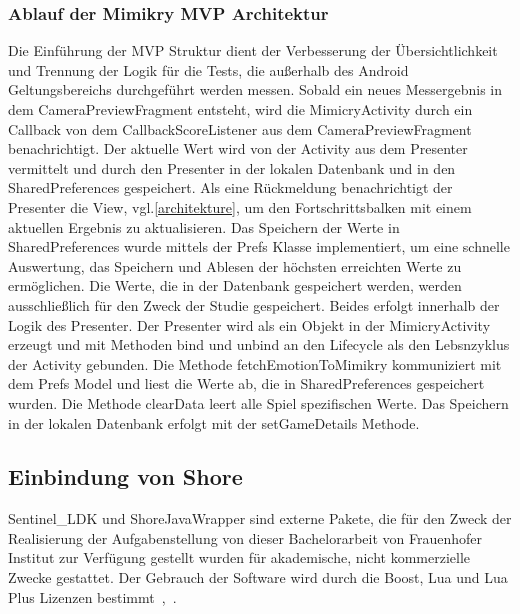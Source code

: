 \subsubsection{Ablauf der Mimikry MVP Architektur}
Die Einführung der MVP Struktur dient der Verbesserung der Übersichtlichkeit und Trennung der Logik für die Tests, die außerhalb des Android Geltungsbereichs durchgeführt werden messen. 
Sobald ein neues Messergebnis in dem CameraPreviewFragment entsteht, wird die MimicryActivity durch ein Callback von dem CallbackScoreListener aus dem CameraPreviewFragment benachrichtigt. Der aktuelle Wert wird von der Activity aus dem Presenter vermittelt und durch den Presenter in der lokalen Datenbank und in den SharedPreferences gespeichert. Als eine Rückmeldung benachrichtigt der Presenter die View, vgl.\ref{architekture}, um den Fortschrittsbalken mit einem aktuellen Ergebnis zu aktualisieren. 
Das Speichern der Werte in SharedPreferences wurde mittels der Prefs Klasse implementiert, um eine schnelle Auswertung, das Speichern und Ablesen der höchsten erreichten Werte zu ermöglichen. Die Werte, die in der Datenbank gespeichert werden, werden ausschließlich für den Zweck der Studie gespeichert. Beides erfolgt innerhalb der Logik des Presenter.
Der Presenter wird als ein Objekt in der MimicryActivity erzeugt und mit Methoden bind und unbind an den Lifecycle als den Lebsnzyklus der Activity gebunden. Die Methode fetchEmotionToMimikry kommuniziert mit dem Prefs Model und liest die Werte ab, die in SharedPreferences gespeichert wurden. Die Methode clearData leert alle Spiel spezifischen Werte. Das Speichern in der lokalen Datenbank erfolgt mit der setGameDetails Methode.

\subsection{Einbindung von Shore\re}
Sentinel\_LDK und ShoreJavaWrapper sind externe Pakete, die für den Zweck der Realisierung der Aufgabenstellung von dieser Bachelorarbeit von Frauenhofer Institut zur Verfügung gestellt wurden für akademische, nicht kommerzielle Zwecke gestattet. Der Gebrauch der Software wird durch die Boost, Lua und Lua Plus Lizenzen bestimmt~\cite{shore},~\cite{Kueblbeck}.

